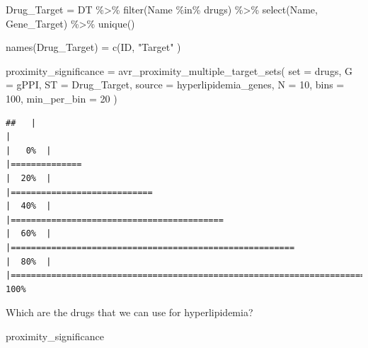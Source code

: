 \documentclass[
]{book}
\newenvironment{Shaded}{\begin{snugshade}}{\end{snugshade}}
\newcommand{\AttributeTok}[1]{\textcolor[rgb]{0.77,0.63,0.00}{#1}}
\newcommand{\DecValTok}[1]{\textcolor[rgb]{0.00,0.00,0.81}{#1}}
\newcommand{\FunctionTok}[1]{\textcolor[rgb]{0.00,0.00,0.00}{#1}}
\newcommand{\NormalTok}[1]{#1}
\newcommand{\OtherTok}[1]{\textcolor[rgb]{0.56,0.35,0.01}{#1}}
\newcommand{\SpecialCharTok}[1]{\textcolor[rgb]{0.00,0.00,0.00}{#1}}
\newcommand{\StringTok}[1]{\textcolor[rgb]{0.31,0.60,0.02}{#1}}
\begin{document}
\begin{Shaded}
\begin{Highlighting}[]
\NormalTok{Drug\_Target }\OtherTok{=}\NormalTok{ DT }\SpecialCharTok{\%\textgreater{}\%} 
  \FunctionTok{filter}\NormalTok{(Name }\SpecialCharTok{\%in\%}\NormalTok{ drugs) }\SpecialCharTok{\%\textgreater{}\%} 
  \FunctionTok{select}\NormalTok{(Name, Gene\_Target) }\SpecialCharTok{\%\textgreater{}\%} 
  \FunctionTok{unique}\NormalTok{()}

\FunctionTok{names}\NormalTok{(Drug\_Target) }\OtherTok{=} \FunctionTok{c}\NormalTok{(}\StringTok{\textquotesingle{}ID\textquotesingle{}}\NormalTok{, }\StringTok{"Target"}\NormalTok{ )}

\NormalTok{proximity\_significance }\OtherTok{=} \FunctionTok{avr\_proximity\_multiple\_target\_sets}\NormalTok{(}
  \AttributeTok{set =}\NormalTok{ drugs,}
  \AttributeTok{G =}\NormalTok{ gPPI,}
  \AttributeTok{ST =}\NormalTok{ Drug\_Target,}
  \AttributeTok{source =}\NormalTok{ hyperlipidemia\_genes,}
  \AttributeTok{N =} \DecValTok{10}\NormalTok{,}
  \AttributeTok{bins =} \DecValTok{100}\NormalTok{,}
  \AttributeTok{min\_per\_bin =} \DecValTok{20}
\NormalTok{)}
\end{Highlighting}
\end{Shaded}

\begin{verbatim}
##   |                                                                              |                                                                      |   0%  |                                                                              |==============                                                        |  20%  |                                                                              |============================                                          |  40%  |                                                                              |==========================================                            |  60%  |                                                                              |========================================================              |  80%  |                                                                              |======================================================================| 100%
\end{verbatim}

Which are the drugs that we can use for hyperlipidemia?

\begin{Shaded}
\begin{Highlighting}[]
\NormalTok{proximity\_significance}
\end{Highlighting}
\end{Shaded}
\end{document}

